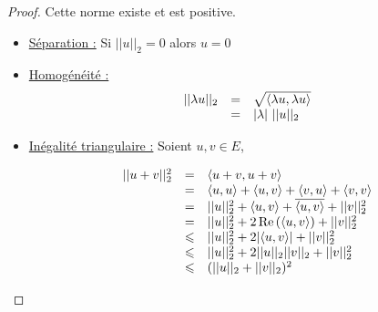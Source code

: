 \begin{proof}
    Cette norme existe et est positive. 

    \begin{itemize}
        \item \uline{Séparation :} Si $||u||_2 = 0$ alors $u=0$

        \item \uline{Homogénéité :}
        \[
            \begin{array}{rcl}
                || \lambda u ||_2 & = & \sqrt{\langle\lambda u, \lambda u \rangle} \\
                \space & = & |\lambda| ~ ||u||_2
            \end{array}
        \]

        \item \uline{Inégalité triangulaire :} Soient $u, v \in E$,

        \[
        \begin{array}{rcl}
            ||u + v||^2_2 & = & \langle u + v, u + v \rangle  \\
            \space & = & \langle u, u \rangle + \langle u, v \rangle + \langle v, u \rangle + \langle v, v \rangle \\
            \space & = & ||u||_2^2 + \langle u, v \rangle + \overline{\langle u, v \rangle} + ||v||_2^2  \\
            \space & =& ||u||_2^2 + 2 \operatorname{Re} \,(\langle u, v \rangle) + ||v||_2^2 \\
            \space & \leqslant & ||u||_2^2 + 2 |\langle u, v \rangle| + ||v||_2^2 \\
            \space & \leqslant & ||u||_2^2 + 2 ||u||_2 ||v||_2 + ||v||_2^2 \\
            \space & \leqslant & (||u||_2 + ||v||_2)^2 \\
        \end{array}
        \]
    \end{itemize}
\end{proof}


